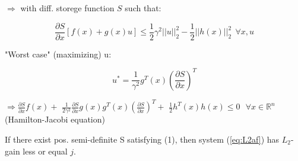 $\Rightarrow$ with diff. storege function $S$ such that:

$$\frac{\partial S}{\partial x} [f(x)+g(x)u] \le \frac{1}{2}\gamma^2||u||^2_2-\frac{1}{2}||h(x)||_2^2\ \ \forall x,u$$


"Worst case" (maximizing) u:

$$u^*=\frac{1}{\gamma^2} g^T(x)\left(\frac{\partial S}{\partial x}\right)^T$$

$\Rightarrow \frac{\partial S}{\partial x} f(x)+$
$\frac{1}{2\gamma^2}\frac{\partial S}{\partial x}g(x)g^T(x)\left(\frac{\partial S}{\partial x}\right)^T+$
$\frac{1}{2}h^T(x)h(x)\le 0 \ \ \ \forall x\in\mathbb{R}^n$ (Hamilton-Jacobi equation)

If there exist pos. semi-definite S satisfying (1), then system (\ref{eq:L2af}) has $L_2$-gain
less or equal $j$.
